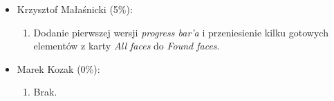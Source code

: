 \documentclass[a4paper,titlepage]{article}
\theoremstyle{break}
\numberwithin{equation}{subsection}
\begin{document}
\begin{appendices}
\begin{itemize}
\begin{enumerate}
	\end{enumerate}
\item Krzysztof Małaśnicki (5\%):
	\begin{enumerate}
		\item Dodanie pierwszej wersji \emph{progress bar'a} i przeniesienie kilku gotowych elementów z karty \emph{All faces} do \emph{Found faces}.
	\end{enumerate}
\item Marek Kozak (0\%):
	\begin{enumerate}
		\item Brak.
	\end{enumerate}
\end{itemize}

\end{appendices}


\clearpage
\printbibliography[title=Bibliografia]
\end{document}
